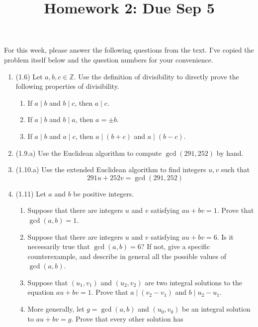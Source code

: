 \documentclass[12pt]{amsart}
\theoremstyle{definition}
\begin{document}
\title{Homework 2: Due Sep 5}

\maketitle

For this week, please answer the following questions from the text. 
I've copied the problem itself below and the question numbers for 
your convenience. 

\begin{enumerate}
	\item (1.6) Let $a,b,c \in \mathbb{Z}$. Use the definition of divisibility to directly prove
		the following properties of divisibility.
		\begin{enumerate}
			\item If $a \mid b$ and $b \mid c$, then $a \mid c$. 
			\item If $a \mid b$ and $b \mid a$, then $a = \pm b$.
			\item If $a \mid b$ and $a \mid c$, then $a \mid (b+c)$ and $a \mid (b-c)$.
		\end{enumerate}
	\item (1.9.a) Use the Euclidean algorithm to compute $\operatorname{gcd}(291,252)$ by hand. 
	\item (1.10.a) Use the extended Euclidean algorithm to find integers $u,v$ such that 
		\begin{displaymath}
			291u + 252v = \operatorname{gcd}(291,252)
		\end{displaymath}
	\item (1.11) Let $a$ and $b$ be positive integers. 
		\begin{enumerate}
			\item Suppose that there are integers $u$ and $v$ satisfying $au + bv = 1$. Prove 
			that $\operatorname{gcd}(a,b) = 1$. 
			\item Suppose that there are integers $u$ and $v$ satisfying $au + bv = 6$. Is 
				it necessarily true that $\operatorname{gcd}(a,b) = 6$? If not, give a 
				specific counterexample, and describe in general all the possible values 
				of $\operatorname{gcd}(a,b)$. 
			\item Suppose that $(u_1,v_1)$ and $(u_2,v_2)$ are two integral solutions to the 
				equation $au + bv = 1$. Prove that $a \mid (v_2 - v_1)$ and $b \mid u_2 -
				u_1$. 
			\item More generally, let $g = \operatorname{gcd}(a,b)$ and $(u_0,v_0)$ be an 
				integral solution to $au + bv = g$. Prove that every other solution has 

\end{enumerate}
\end{enumerate}
\end{document}
